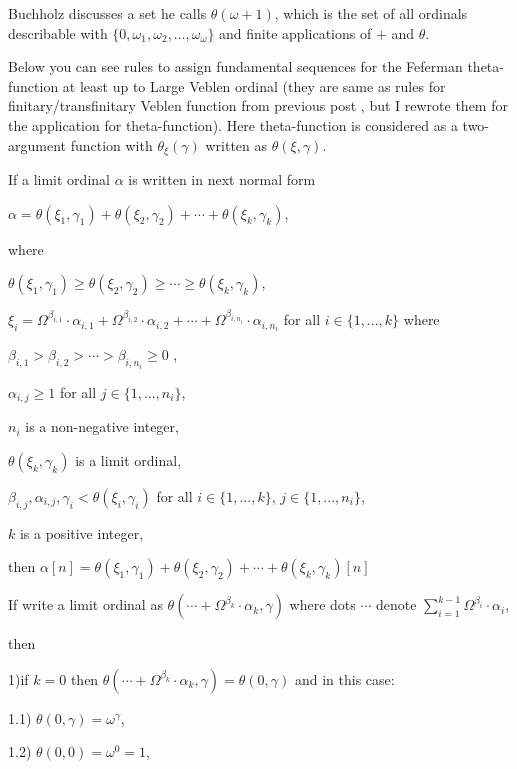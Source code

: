 \documentclass[10pt]{article}
\begin{document}
Buchholz discusses a set he calls \(\theta(\omega + 1)\), which is the set of all ordinals describable with \(\{0, \omega_1, \omega_2, \ldots, \omega_\omega\}\) and finite applications of \(+\) and \(\theta\).

\bigskip


Below you can see rules to assign fundamental sequences for the Feferman theta-function at least up to Large Veblen ordinal (they are same as rules for finitary/transfinitary Veblen function from previous post , but I rewrote them for the application for theta-function). Here theta-function is considered as a two-argument function with \(\theta_\xi(\gamma)\) written as \(\theta(\xi,\gamma)\).

If a limit ordinal \(\alpha\) is written in next normal form

\(\alpha=\theta(\xi_1,\gamma_1)+\theta(\xi_2,\gamma_2)+\cdots+\theta(\xi_k,\gamma_k)\),

where

\(\theta(\xi_1,\gamma_1)\geq \theta(\xi_2,\gamma_2)\geq\cdots\geq\theta(\xi_k,\gamma_k)\),

\(\xi_i=\Omega^{\beta_{i,1}}\cdot \alpha_{i,1}+\Omega^{\beta_{i,2}}\cdot \alpha_{i,2}+\cdots+\Omega^{\beta_{i,n_i}}\cdot \alpha_{i,n_i}\) for all \(i \in \{1,...,k\}\) where

\(\beta_{i,1}>\beta_{i,2}>\cdots>\beta_{i,n_i} \geq 0\) ,

\(\alpha_{i,j}\geq 1\) for all \(j \in \{1,...,n_i \}\),

\(n_i \) is a non-negative integer,

\(\theta(\xi_k,\gamma_k)\) is a limit ordinal,

\(\beta_{i,j},\alpha_{i,j},\gamma_i < \theta(\xi_i, \gamma_i)\) for all \(i \in \{1,...,k\}\), \(j \in \{1,...,n_i \}\),

\(k\) is a positive integer,

then \(\alpha[n]=\theta(\xi_1,\gamma_1)+\theta(\xi_2,\gamma_2)+\cdots+\theta(\xi_k,\gamma_k)[n]\)

If write a limit ordinal as \(\theta(\cdots+\Omega^{\beta_k} \cdot \alpha_k,\gamma)\) where dots \(\cdots\) denote \(\sum_{i=1}^{k-1}\Omega^{\beta_{i}}\cdot \alpha_{i}\),

then

1)if \(k=0\) then \(\theta(\cdots+\Omega^{\beta_k} \cdot \alpha_k,\gamma)=\theta(0,\gamma)\) and in this case:

1.1) \(\theta(0,\gamma)=\omega^\gamma\),

1.2) \(\theta(0,0)=\omega^0=1\),
\end{document}
